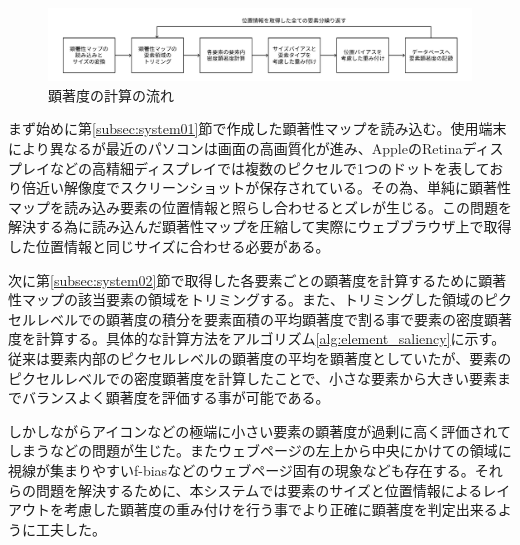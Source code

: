 \begin{figure}[H]
    \centering
    \includegraphics[width=12cm]{figures/06_process03.jpg}
    \caption{顕著度の計算の流れ}
    \label{fig_system03}
\end{figure}

\par まず始めに第\ref{subsec:system01}節で作成した顕著性マップを読み込む。使用端末により異なるが最近のパソコンは画面の高画質化が進み、AppleのRetinaディスプレイなどの高精細ディスプレイでは複数のピクセルで1つのドットを表しており倍近い解像度でスクリーンショットが保存されている。その為、単純に顕著性マップを読み込み要素の位置情報と照らし合わせるとズレが生じる。この問題を解決する為に読み込んだ顕著性マップを圧縮して実際にウェブブラウザ上で取得した位置情報と同じサイズに合わせる必要がある。

\par 次に第\ref{subsec:system02}節で取得した各要素ごとの顕著度を計算するために顕著性マップの該当要素の領域をトリミングする。また、トリミングした領域のピクセルレベルでの顕著度の積分を要素面積の平均顕著度で割る事で要素の密度顕著度を計算する。具体的な計算方法をアルゴリズム\ref{alg:element_saliency}に示す。従来は要素内部のピクセルレベルの顕著度の平均を顕著度としていたが、要素のピクセルレベルでの密度顕著度を計算したことで、小さな要素から大きい要素までバランスよく顕著度を評価する事が可能である。

\par しかしながらアイコンなどの極端に小さい要素の顕著度が過剰に高く評価されてしまうなどの問題が生じた。またウェブページの左上から中央にかけての領域に視線が集まりやすいf-biasなどのウェブページ固有の現象なども存在する。それらの問題を解決するために、本システムでは要素のサイズと位置情報によるレイアウトを考慮した顕著度の重み付けを行う事でより正確に顕著度を判定出来るように工夫した。

